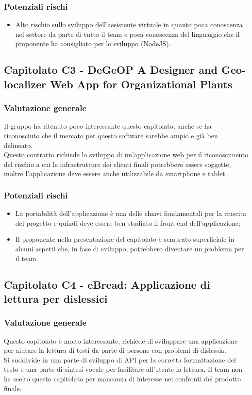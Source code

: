 \documentclass[12pt,a4paper,titlepage]{article}
\begin{document}
	\subsubsection{Potenziali rischi}
	\begin{itemize}
		\item Alto rischio sullo sviluppo dell'assistente virtuale in quanto poca conoscenza nel settore da parte di tutto il team e poca conoscenza del linguaggio che il proponente ha consigliato per lo sviluppo (NodeJS).
	\end{itemize}
	
	\subsection{Capitolato C3 - DeGeOP A Designer and Geo-localizer Web App for Organizational Plants}
	\subsubsection{Valutazione generale}
	Il gruppo ha ritenuto poco interessante questo capitolato, anche se ha riconosciuto che il mercato per questo software sarebbe ampio e già ben delineato. \\
	Questo contratto richiede lo sviluppo di un'applicazione web per il riconoscimento del rischio a cui le infrastrutture dei clienti finali potrebbero essere soggette, inoltre l'applicazione deve essere anche utilizzabile da smartphone e tablet.
	\subsubsection{Potenziali rischi}
	\begin{itemize}
		\item La portabilità dell'applicazione è una delle chiavi fondamentali per la riuscita del progetto e quindi deve essere ben studiato il front end dell'applicazione;
		\item  Il proponente nella presentazione del capitolato è sembrato superficiale in alcuni aspetti che, in fase di sviluppo, potrebbero diventare un problema per il team.
	\end{itemize}
	
	\subsection{Capitolato C4 - eBread: Applicazione di lettura per dislessici}
	\subsubsection{Valutazione generale}
	Questo capitolato è molto interessante, richiede di sviluppare una applicazione per aiutare la lettura di testi da parte di persone con problemi di dislessia.\\ 
	Si suddivide in una parte di sviluppo di API per la corretta formattazione del testo e una parte di sintesi vocale per facilitare all'utente la lettura. Il team non ha scelto questo capitolato per mancanza di interesse nei confronti del prodotto finale.
\end{document}

